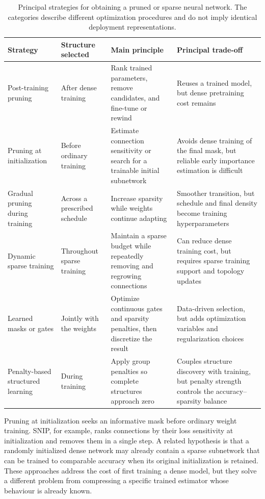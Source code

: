 \documentclass[
    a4paper,
    12pt,
    titlepage,
    bibliography=totoc,
    twoside=on,
    parskip=false,
    numbers=noenddot,
    cleardoublepage=empty,
    DIV=12,
    BCOR=12.0mm,
    headheight=36pt,
    headings=openright
]{scrreprt}
\begin{document}
\begin{table}[htbp]
    \centering
    \small
    \caption[Principal pruning and sparse-training strategies.]{Principal strategies for obtaining a pruned or sparse neural network. The categories describe different optimization procedures and do not imply identical deployment representations.}
    \label{tab:fundamental_pruning_strategies}
    \begin{tabularx}{\textwidth}{>{\raggedright\arraybackslash}p{3.1cm}>{\raggedright\arraybackslash}p{3.1cm}YY}
        \toprule
        Strategy & Structure selected & Main principle & Principal trade-off \\
        \midrule
        Post-training pruning & After dense training & Rank trained parameters, remove candidates, and fine-tune or rewind & Reuses a trained model, but dense pretraining cost remains \\
        Pruning at initialization & Before ordinary training & Estimate connection sensitivity or search for a trainable initial subnetwork & Avoids dense training of the final mask, but reliable early importance estimation is difficult \\
        Gradual pruning during training & Across a prescribed schedule & Increase sparsity while weights continue adapting & Smoother transition, but schedule and final density become training hyperparameters \\
        Dynamic sparse training & Throughout sparse training & Maintain a sparse budget while repeatedly removing and regrowing connections & Can reduce dense training cost, but requires sparse training support and topology updates \\
        Learned masks or gates & Jointly with the weights & Optimize continuous gates and sparsity penalties, then discretize the result & Data-driven selection, but adds optimization variables and regularization choices \\
        Penalty-based structured learning & During training & Apply group penalties so complete structures approach zero & Couples structure discovery with training, but penalty strength controls the accuracy--sparsity balance \\
        \bottomrule
    \end{tabularx}
\end{table}

Pruning at initialization seeks an informative mask before ordinary weight training. SNIP, for example, ranks connections by their loss sensitivity at initialization and removes them in a single step.\autocite{leeSNIPSingleShot2019} A related hypothesis is that a randomly initialized dense network may already contain a sparse subnetwork that can be trained to comparable accuracy when its original initialization is retained.\autocite{frankleLotteryTicketHypothesis2019} These approaches address the cost of first training a dense model, but they solve a different problem from compressing a specific trained estimator whose behaviour is already known.
\end{document}
